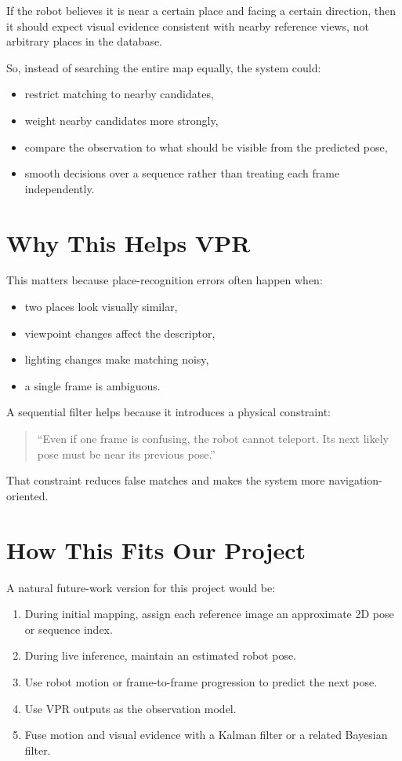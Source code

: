 \documentclass[11pt]{article}
\begin{document}
If the robot believes it is near a certain place and facing a certain direction, then it should expect visual evidence consistent with nearby reference views, not arbitrary places in the database.

So, instead of searching the entire map equally, the system could:
\begin{itemize}[leftmargin=*]
  \item restrict matching to nearby candidates,
  \item weight nearby candidates more strongly,
  \item compare the observation to what should be visible from the predicted pose,
  \item smooth decisions over a sequence rather than treating each frame independently.
\end{itemize}

\section*{Why This Helps VPR}
This matters because place-recognition errors often happen when:
\begin{itemize}[leftmargin=*]
  \item two places look visually similar,
  \item viewpoint changes affect the descriptor,
  \item lighting changes make matching noisy,
  \item a single frame is ambiguous.
\end{itemize}

A sequential filter helps because it introduces a physical constraint:
\begin{quote}
``Even if one frame is confusing, the robot cannot teleport. Its next likely pose must be near its previous pose.''
\end{quote}

That constraint reduces false matches and makes the system more navigation-oriented.

\section*{How This Fits Our Project}
A natural future-work version for this project would be:

\begin{enumerate}[leftmargin=*]
  \item During initial mapping, assign each reference image an approximate 2D pose or sequence index.
  \item During live inference, maintain an estimated robot pose.
  \item Use robot motion or frame-to-frame progression to predict the next pose.
  \item Use VPR outputs as the observation model.
  \item Fuse motion and visual evidence with a Kalman filter or a related Bayesian filter.
\end{enumerate}
\end{document}
